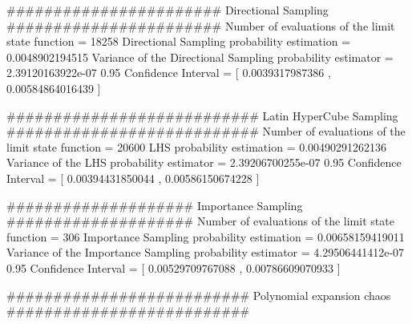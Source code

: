 #######################
Directional Sampling
#######################
Number of evaluations of the limit state function =  18258
Directional Sampling probability estimation =  0.0048902194515
Variance of the Directional Sampling probability estimator =  2.39120163922e-07
0.95 Confidence Interval = [ 0.0039317987386 ,  0.00584864016439 ]

###########################
Latin HyperCube Sampling
###########################
Number of evaluations of the limit state function =  20600
LHS probability estimation =  0.00490291262136
Variance of the LHS probability estimator =  2.39206700255e-07
0.95 Confidence Interval = [ 0.00394431850044 ,  0.00586150674228 ]

####################
Importance Sampling
####################
Number of evaluations of the limit state function =  306
Importance Sampling probability estimation =  0.00658159419011
Variance of the Importance Sampling probability estimator =  4.29506441412e-07
0.95 Confidence Interval = [ 0.00529709767088 ,  0.00786609070933 ]


##########################
Polynomial expansion chaos
##########################

